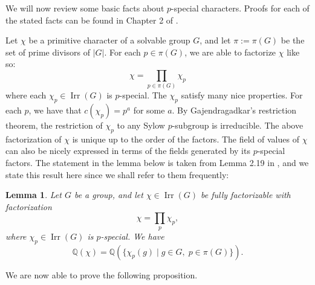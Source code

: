 \documentclass[12pt]{amsart}
\newtheorem{lemma}[theorem]{Lemma}
\theoremstyle{definition}
\newcommand{\Q}{\mathbb{Q}}
\DeclareMathOperator{\Irr}{Irr}
\begin{document}
We will now review some basic facts about $p$-special characters. Proofs for each of the stated facts can be found in Chapter 2 of \cite{Is2}. 

Let $\chi$ be a primitive character of a solvable group $G$, and let $\pi := \pi(G)$ be the set of prime divisors of $|G|$. For each $p \in \pi(G)$, we are able to factorize $\chi$ like so:
$$
\chi = \prod_{p \in \pi(G)} \chi_p
$$
where each $\chi_p \in \Irr(G)$ is $p$-special. The $\chi_p$ satisfy many nice properties. For each $p$, we have that $c(\chi_p) = p^a$ for some $a$. By Gajendragadkar's restriction theorem, the restriction of $\chi_p$ to any Sylow $p$-subgroup is irreducible. The above factorization of $\chi$ is unique up to the order of the factors. The field of values of $\chi$ can also be nicely expressed in terms of the fields generated by its $p$-special factors. The statement in the lemma below is taken from Lemma 2.19 in \cite{Is2}, and we state this result here since we shall refer to them frequently:
\begin{lemma}\label{L:Is-stuff}
	Let $G$ be a group, and let $\chi \in \Irr(G)$ be fully factorizable with factorization
		$$
		\chi = \prod_{p} \chi_p,
		$$
		where $\chi_p \in \Irr(G)$ is $p$-special. We have
		$$
		\Q(\chi) = \Q(\{\chi_p(g) \; | \; g \in G, \; p \in \pi(G)\}).
		$$
\end{lemma}

We are now able to prove the following proposition.
\end{document}
